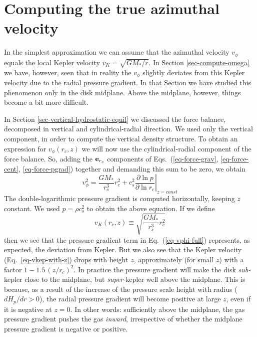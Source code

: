 \documentclass{book}
\begin{document}
\section{Computing the true azimuthal velocity}
\label{sec-true-vphi}
%
In the simplest approximation we can assume that the azimuthal velocity $v_\phi$
equals the local Kepler velocity $v_K=\sqrt{GM_{*}/r}$. In Section
\ref{sec-compute-omega} we have, however, seen that in reality the $v_\phi$
slightly deviates from this Kepler velocity due to the radial pressure
gradient. In that Section we have studied this phenomenon only in the disk
midplane. Above the midplane, however, things become a bit more difficult.

In Section \ref{sec-vertical-hydrostatic-equil} we discussed the force balance,
decomposed in vertical and cylindrical-radial direction. We used only the
vertical component, in order to compute the vertical density structure.  To
obtain an expression for $v_\phi(r_c,z)$ we will now use the cylindrical-radial
component of the force balance. So, adding the ${\bf e}_{r_c}$ components of
Eqs.~(\ref{eq-force-grav}, \ref{eq-force-cent}, \ref{eq-force-pgrad}) together
and demanding this sum to be zero, we obtain
\begin{equation}\label{eq-vphi-full}
  v_\phi^2 = \frac{GM_{*}}{r_s^3}r_c^2 + c_s^2\left.\frac{\partial \ln p}{\partial \ln r_c}\right|_{z=const}
\end{equation}
The double-logarithmic pressure gradient is computed horizontally, keeping $z$
constant. We used $p=\rho c_s^2$ to obtain the above equation. If we
define
\begin{equation}\label{eq-vkep-with-z}
v_K(r_c,z) \equiv \sqrt{\frac{GM_{*}}{r_s^3}r_c^2}
\end{equation}
then we see that the pressure gradient term in Eq.~(\ref{eq-vphi-full})
represents, as expected, the deviation from Kepler. But we also see that the
Kepler velocity (Eq.~\ref{eq-vkep-with-z}) drops with height $z$, approximately
(for small $z$) with a factor $1-1.5\,(z/r_c)^2$. In practice the pressure
gradient will make the disk {\em sub-}kepler close to the midplane, but {\em
  super-}kepler well above the midplane. This is because, as a result of the
increase of the pressure scale height with radius ($dH_p/dr>0$), the radial
pressure gradient will become positive at large $z$, even if it is negative at
$z=0$. In other words: sufficiently above the midplane, the gas pressure
gradient pushes the gas {\em inward}, irrespective of whether the midplane
pressure gradient is negative or positive.
\end{document}
